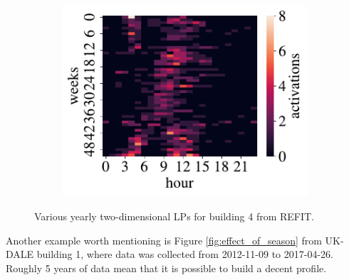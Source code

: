 \begin{figure}[H]
\begin{subfigure}{.32\textwidth}
		\includegraphics[width=1\textwidth]{../Figures/LPS/HM_Ywh_wm.pdf}
		\label{fig:HM_Ywh_wm}
	\end{subfigure}%
	
	\caption{Various yearly two-dimensional LPs for building 4 from REFIT.}
	\label{fig:var_2d_lpss}
\end{figure}

Another example worth mentioning is Figure \ref{fig:effect_of_season} from UK-DALE building 1, where data was collected from 2012-11-09 to 2017-04-26.
Roughly 5 years of data mean that it is possible to build a decent profile. 


